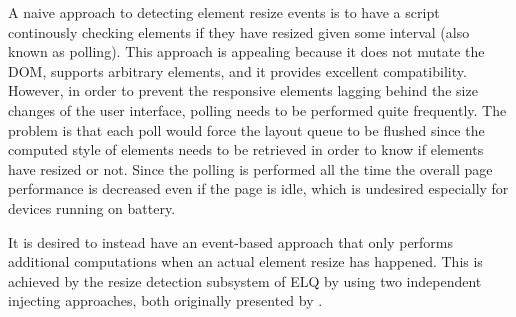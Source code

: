 \documentclass{acm_proc_article-sp}
\newcommand{\elq}{ELQ}
\newcommand{\gls}[1]{#1}
\begin{document}
    A naive approach to detecting element resize events is to have a script continously checking elements if they have resized given some interval (also known as polling).
    This approach is appealing because it does not mutate the \gls{DOM}, supports arbitrary elements, and it provides excellent compatibility.
    However, in order to prevent the \gls{responsive} elements lagging behind the size changes of the user interface, polling needs to be performed quite frequently.
    The problem is that each poll would force the layout queue to be flushed since the computed style of elements needs to be retrieved in order to know if elements have resized or not.
    Since the polling is performed all the time the overall page performance is decreased even if the page is idle, which is undesired especially for devices running on battery.



    It is desired to instead have an event-based approach that only performs additional computations when an actual element resize has happened.
    This is achieved by the resize detection subsystem of \elq{} by using two independent injecting approaches, both originally presented by \cite{backalley}.
\end{document}
